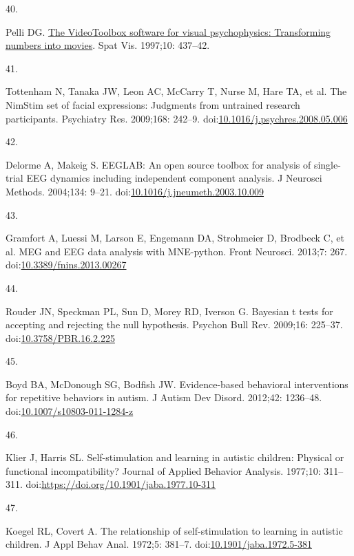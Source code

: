 \documentclass[
  letterpaper,
  DIV=11,
  numbers=noendperiod]{scrartcl}
\newlength{\cslhangindent}
\newlength{\csllabelwidth}
\newenvironment{CSLReferences}[2] %
 {\begin{list}{}{%
  \setlength{\itemindent}{0pt}
  \setlength{\leftmargin}{0pt}
  \setlength{\parsep}{0pt}
  \ifodd #1
   \setlength{\leftmargin}{\cslhangindent}
   \setlength{\itemindent}{-1\cslhangindent}
  \fi
  \setlength{\itemsep}{#2\baselineskip}}}
 {\end{list}}
\newcommand{\CSLLeftMargin}[1]{\parbox[t]{\csllabelwidth}{\strut#1\strut}}
\newcommand{\CSLRightInline}[1]{\parbox[t]{\linewidth - \csllabelwidth}{\strut#1\strut}}
\begin{document}
\begin{CSLReferences}{0}{1}
\CSLLeftMargin{40. }%
\CSLRightInline{Pelli DG.
\href{https://www.ncbi.nlm.nih.gov/pubmed/9176953}{The VideoToolbox
software for visual psychophysics: Transforming numbers into movies}.
Spat Vis. 1997;10: 437--42. }

\CSLLeftMargin{41. }%
\CSLRightInline{Tottenham N, Tanaka JW, Leon AC, McCarry T, Nurse M,
Hare TA, et al. The NimStim set of facial expressions: Judgments from
untrained research participants. Psychiatry Res. 2009;168: 242--9.
doi:\href{https://doi.org/10.1016/j.psychres.2008.05.006}{10.1016/j.psychres.2008.05.006}}

\CSLLeftMargin{42. }%
\CSLRightInline{Delorme A, Makeig S. {EEGLAB}: An open source toolbox
for analysis of single-trial {EEG} dynamics including independent
component analysis. J Neurosci Methods. 2004;134: 9--21.
doi:\href{https://doi.org/10.1016/j.jneumeth.2003.10.009}{10.1016/j.jneumeth.2003.10.009}}

\CSLLeftMargin{43. }%
\CSLRightInline{Gramfort A, Luessi M, Larson E, Engemann DA, Strohmeier
D, Brodbeck C, et al. MEG and EEG data analysis with MNE-python. Front
Neurosci. 2013;7: 267.
doi:\href{https://doi.org/10.3389/fnins.2013.00267}{10.3389/fnins.2013.00267}}

\CSLLeftMargin{44. }%
\CSLRightInline{Rouder JN, Speckman PL, Sun D, Morey RD, Iverson G.
Bayesian t tests for accepting and rejecting the null hypothesis.
Psychon Bull Rev. 2009;16: 225--37.
doi:\href{https://doi.org/10.3758/PBR.16.2.225}{10.3758/PBR.16.2.225}}

\CSLLeftMargin{45. }%
\CSLRightInline{Boyd BA, McDonough SG, Bodfish JW. Evidence-based
behavioral interventions for repetitive behaviors in autism. J Autism
Dev Disord. 2012;42: 1236--48.
doi:\href{https://doi.org/10.1007/s10803-011-1284-z}{10.1007/s10803-011-1284-z}}

\CSLLeftMargin{46. }%
\CSLRightInline{Klier J, Harris SL. Self-stimulation and learning in
autistic children: Physical or functional incompatibility? Journal of
Applied Behavior Analysis. 1977;10: 311--311.
doi:\url{https://doi.org/10.1901/jaba.1977.10-311}}

\CSLLeftMargin{47. }%
\CSLRightInline{Koegel RL, Covert A. The relationship of
self-stimulation to learning in autistic children. J Appl Behav Anal.
1972;5: 381--7.
doi:\href{https://doi.org/10.1901/jaba.1972.5-381}{10.1901/jaba.1972.5-381}}


\end{CSLReferences}
\end{document}
